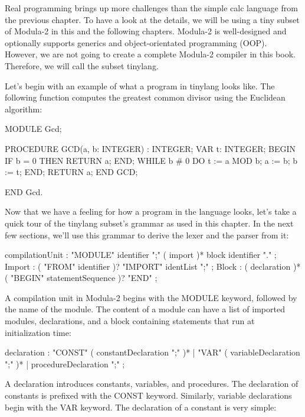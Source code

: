 Real programming brings up more challenges than the simple calc language from the previous chapter.
To have a look at the details, we will be using a tiny subset of Modula-2 in this and the following chapters. Modula-2 is well-designed and optionally supports generics and object-orientated programming (OOP). However, we are not going to create a complete Modula-2 compiler in this book. Therefore, we will call the subset tinylang.

Let’s begin with an example of what a program in tinylang looks like. The following function computes the greatest common divisor using the Euclidean algorithm:

\begin{shell}
MODULE Gcd;

PROCEDURE GCD(a, b: INTEGER) : INTEGER;
VAR t: INTEGER;
BEGIN
    IF b = 0 THEN
        RETURN a;
    END;
    WHILE b # 0 DO
        t := a MOD b;
        a := b;
        b := t;
    END;
    RETURN a;
END GCD;

END Gcd.
\end{shell}

Now that we have a feeling for how a program in the language looks, let’s take a quick tour of the tinylang subset’s grammar as used in this chapter. In the next few sections, we’ll use this grammar to derive the lexer and the parser from it:

\begin{shell}
compilationUnit
    : "MODULE" identifier ";" ( import )* block identifier "." ;
Import : ( "FROM" identifier )? "IMPORT" identList ";" ;
Block
    : ( declaration )* ( "BEGIN" statementSequence )? "END" ;
\end{shell}

A compilation unit in Modula-2 begins with the MODULE keyword, followed by the name of the module. The content of a module can have a list of imported modules, declarations, and a block containing statements that run at initialization time:

\begin{shell}
declaration
    : "CONST" ( constantDeclaration ";" )*
    | "VAR" ( variableDeclaration ";" )*
    | procedureDeclaration ";" ;
\end{shell}

A declaration introduces constants, variables, and procedures. The declaration of constants is prefixed with the CONST keyword. Similarly, variable declarations begin with the VAR keyword. The declaration of a constant is very simple:

